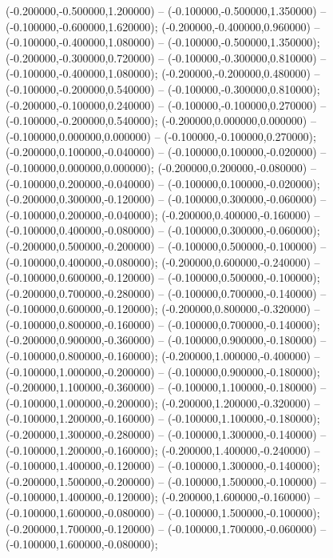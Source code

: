  (-0.200000,-0.500000,1.200000) -- (-0.100000,-0.500000,1.350000) -- (-0.100000,-0.600000,1.620000);
 (-0.200000,-0.400000,0.960000) -- (-0.100000,-0.400000,1.080000) -- (-0.100000,-0.500000,1.350000);
 (-0.200000,-0.300000,0.720000) -- (-0.100000,-0.300000,0.810000) -- (-0.100000,-0.400000,1.080000);
 (-0.200000,-0.200000,0.480000) -- (-0.100000,-0.200000,0.540000) -- (-0.100000,-0.300000,0.810000);
 (-0.200000,-0.100000,0.240000) -- (-0.100000,-0.100000,0.270000) -- (-0.100000,-0.200000,0.540000);
 (-0.200000,0.000000,0.000000) -- (-0.100000,0.000000,0.000000) -- (-0.100000,-0.100000,0.270000);
 (-0.200000,0.100000,-0.040000) -- (-0.100000,0.100000,-0.020000) -- (-0.100000,0.000000,0.000000);
 (-0.200000,0.200000,-0.080000) -- (-0.100000,0.200000,-0.040000) -- (-0.100000,0.100000,-0.020000);
 (-0.200000,0.300000,-0.120000) -- (-0.100000,0.300000,-0.060000) -- (-0.100000,0.200000,-0.040000);
 (-0.200000,0.400000,-0.160000) -- (-0.100000,0.400000,-0.080000) -- (-0.100000,0.300000,-0.060000);
 (-0.200000,0.500000,-0.200000) -- (-0.100000,0.500000,-0.100000) -- (-0.100000,0.400000,-0.080000);
 (-0.200000,0.600000,-0.240000) -- (-0.100000,0.600000,-0.120000) -- (-0.100000,0.500000,-0.100000);
 (-0.200000,0.700000,-0.280000) -- (-0.100000,0.700000,-0.140000) -- (-0.100000,0.600000,-0.120000);
 (-0.200000,0.800000,-0.320000) -- (-0.100000,0.800000,-0.160000) -- (-0.100000,0.700000,-0.140000);
 (-0.200000,0.900000,-0.360000) -- (-0.100000,0.900000,-0.180000) -- (-0.100000,0.800000,-0.160000);
 (-0.200000,1.000000,-0.400000) -- (-0.100000,1.000000,-0.200000) -- (-0.100000,0.900000,-0.180000);
 (-0.200000,1.100000,-0.360000) -- (-0.100000,1.100000,-0.180000) -- (-0.100000,1.000000,-0.200000);
 (-0.200000,1.200000,-0.320000) -- (-0.100000,1.200000,-0.160000) -- (-0.100000,1.100000,-0.180000);
 (-0.200000,1.300000,-0.280000) -- (-0.100000,1.300000,-0.140000) -- (-0.100000,1.200000,-0.160000);
 (-0.200000,1.400000,-0.240000) -- (-0.100000,1.400000,-0.120000) -- (-0.100000,1.300000,-0.140000);
 (-0.200000,1.500000,-0.200000) -- (-0.100000,1.500000,-0.100000) -- (-0.100000,1.400000,-0.120000);
 (-0.200000,1.600000,-0.160000) -- (-0.100000,1.600000,-0.080000) -- (-0.100000,1.500000,-0.100000);
 (-0.200000,1.700000,-0.120000) -- (-0.100000,1.700000,-0.060000) -- (-0.100000,1.600000,-0.080000);
